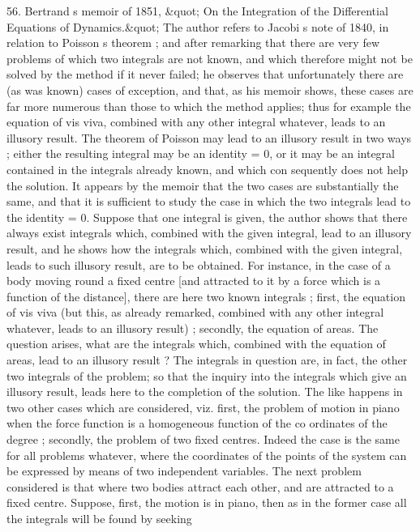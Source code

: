 \documentclass[11pt,a4paper]{book}
\begin{document}
56.
Bertrand s
memoir
of
1851,
\&quot; On
the Integration
of the
Differential
Equations
of
Dynamics.\&quot;
The
author
refers
to
Jacobi s
note
of
1840,
in
relation
to
Poisson s
theorem
;
and
after
remarking
that
there
are
very few problems
of which two
integrals
are
not
known,
and
which
therefore
might
not
be
solved
by
the
method
if
it
never
failed;
he
observes
that
unfortunately there
are
(as was
known) cases of
exception, and
that,
as
his
memoir
shows, these
cases are
far more numerous
than
those
to which the
method
applies;
thus
for
example
the
equation
of
vis
viva,
combined
with
any
other
integral
whatever,
leads
to
an
illusory
result.
The
theorem
of
Poisson
may
lead
to
an
illusory result
in
two ways
;
either
the
resulting
integral may be an
identity
= 0,
or
it may
be
an
integral
contained
in
the
integrals
already
known,
and
which
con
sequently
does
not
help
the
solution.
It
appears
by
the
memoir
that
the
two
cases
are
substantially
the
same,
and
that
it
is
sufficient
to
study
the
case
in
which
the
two
integrals
lead
to
the
identity
= 0.
Suppose
that
one
integral
is
given,
the
author
shows
that
there
always
exist
integrals
which, combined with
the given
integral,
lead
to
an
illusory
result,
and
he
shows how
the
integrals
which, combined with
the
given
integral,
leads
to
such
illusory
result,
are
to
be
obtained.
For
instance,
in
the
case
of
a
body
moving
round
a
fixed
centre
[and
attracted
to
it
by
a
force
which
is
a
function
of
the
distance],
there
are
here
two
known
integrals
;
first,
the
equation
of
vis viva
(but
this,
as
already
remarked, combined with
any
other
integral whatever,
leads
to an
illusory
result)
;
secondly, the equation of areas.
The
question
arises,
what
are
the
integrals
which,
combined
with
the
equation
of
areas,
lead
to an
illusory
result ?
The
integrals
in
question
are,
in
fact, the
other two
integrals
of
the
problem;
so
that
the
inquiry into the
integrals
which
give an
illusory
result,
leads
here
to
the
completion
of
the
solution.
The
like
happens
in
two
other
cases
which
are
considered,
viz.
first,
the problem
of
motion
in
piano
when
the
force
function
is
a
homogeneous
function
of
the
co
ordinates
of
the
degree
;
secondly,
the
problem
of two
fixed
centres.
Indeed
the
case
is
the
same
for
all
problems
whatever,
where
the
coordinates
of
the
points
of
the system can be expressed by means of two independent
variables.
The next
problem
considered
is
that where two
bodies
attract
each
other, and are
attracted
to
a
fixed
centre.
Suppose,
first,
the
motion
is
in
piano,
then
as
in
the
former
case
all
the
integrals
will
be found by seeking
\end{document}
